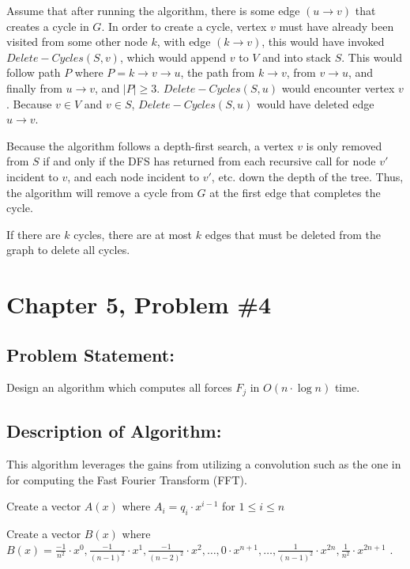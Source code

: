 \documentclass{article}
\begin{document}
Assume that after running the algorithm, there is some edge $(u \rightarrow v)$ that creates a cycle in $G$. In order to create a cycle, vertex $v$ must have already been visited from some other node $k$, with edge $(k \rightarrow v)$, this would have invoked $Delete-Cycles(S,v)$, which would append $v$ to $V$ and into stack $S$.  This would follow path $P$ where $P = k \rightarrow v \rightarrow u$, the path from $k \rightarrow v$, from $v \rightarrow u$, and finally from $u \rightarrow v$, and $|P| \geq 3$.
$Delete-Cycles(S,u)$ would encounter vertex $v$.  Because $v \in V$ and $v \in S$, $Delete-Cycles(S,u)$ would have deleted edge $u \rightarrow v$.  

\noindent Because the algorithm follows a depth-first search, a vertex $v$ is only removed from $S$ if and only if the DFS has returned from each recursive call for node $v'$ incident to $v$, and each node incident to $v'$, etc. down the depth of the tree. Thus, the algorithm will remove a cycle from $G$ at the first edge that completes the cycle. 

\noindent If there are $k$ cycles, there are at most $k$ edges that must be deleted from the graph to delete all cycles.

\newpage

\section*{Chapter 5, Problem \#4}

\subsection*{Problem Statement:}  
Design an algorithm which computes all forces $F_j$ in $O(n \cdot \log{n})$ time.

\subsection*{Description of Algorithm:}
This algorithm leverages the gains from utilizing a convolution such as the one in \cite{algDesign} for computing the Fast Fourier Transform (FFT).

Create a vector $A(x)$ where $A_i = q_i \cdot x^{i-1}$ for $1 \leq i \leq n$

Create a vector $B(x)$ where $B(x) = \frac{-1}{n^2} \cdot x^0, \frac{-1}{(n-1)^2} \cdot x^1, \frac{-1}{(n-2)^2} \cdot x^2, \dots, 0 \cdot x^{n+1}, \dots, \frac{1}{(n-1)^2} \cdot x^{2n}, \frac{1}{n^2} \cdot x^{2n + 1}$ \cite{uic}.
\end{document}
